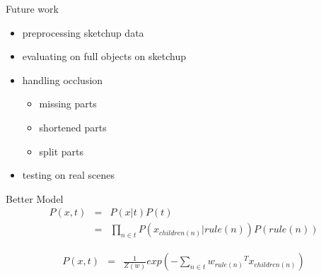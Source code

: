 \documentclass{beamer}
\begin{document}
\begin{frame}{Future work}
\begin{itemize}
\item preprocessing sketchup data
\item evaluating on full objects on sketchup
\item handling occlusion
\begin{itemize}
\item missing parts
\item shortened parts
\item split parts
\end{itemize}
\item testing on real scenes

\end{itemize}
\end{frame}

\begin{frame}{Better Model}
\begin{eqnarray}
P(x,t)&=&P(x|t)P(t) \\
&=& \prod_{n \in t}{P(x_{children(n)} |rule(n) )P(rule(n))}
\end{eqnarray}

\begin{eqnarray}
P(x,t)&=& \frac{1}{Z(w)}{exp(-\sum_{n \in t}{{w_{rule(n)}}^T x_{children(n)}})}
\end{eqnarray}

\end{frame}
\end{document}
